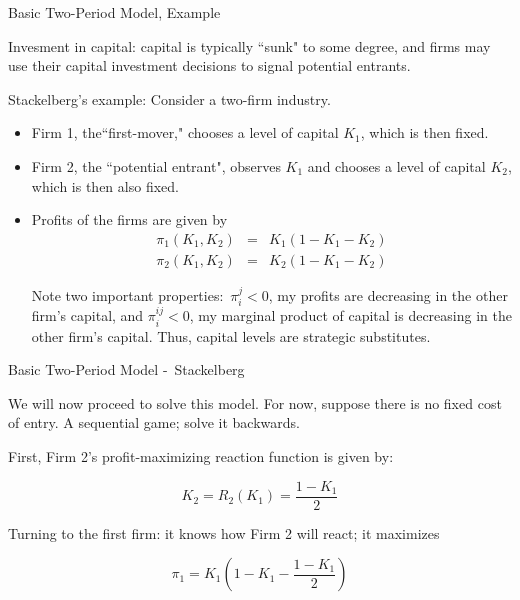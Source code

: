 \begin{frame}{Basic Two-Period Model, Example}



Invesment in capital: capital is typically ``sunk" to some degree, and firms may use their capital investment decisions to signal potential entrants. 

Stackelberg's example: Consider a two-firm industry. 

\begin{itemize}
\item Firm 1, the``first-mover," chooses a level of capital $K_{1}$,
which is then fixed.

\item Firm 2, the ``potential entrant", observes $K_{1}$ and chooses a
level of capital $K_{2}$, which is then also fixed. 

\item Profits of the firms are given by
\begin{eqnarray*}
\pi _{1}\left( K_{1},K_{2}\right)  &=&K_{1}\left( 1-K_{1}-K_{2}\right)  \\
\pi _{2}\left( K_{1},K_{2}\right)  &=&K_{2}\left( 1-K_{1}-K_{2}\right) 
\end{eqnarray*}

Note two important properties:\ $\pi _{i}^{j}<0$, my profits are decreasing
in the other firm's capital, and $\pi _{i}^{ij}<0$, my marginal product of
capital is decreasing in the other firm's capital. Thus, capital levels are
strategic substitutes. 
\end{itemize}

\end{frame}%

\begin{frame}{Basic Two-Period Model -\ Stackelberg}



We will now proceed to solve this model. For now, suppose there is no fixed
cost of entry. A sequential game; solve it backwards. \\
\vspace{0.2in}

First, Firm 2's profit-maximizing reaction function is given by:

\[
K_{2}=R_{2}\left( K_{1}\right) =\frac{1-K_{1}}{2}
\]

Turning to the first firm: it knows how Firm 2 will react; it maximizes

\[
\pi_{1}=K_{1}\left( 1-K_{1}-\frac{1-K_{1}}{2}\right) 
\]

\end{frame}%

